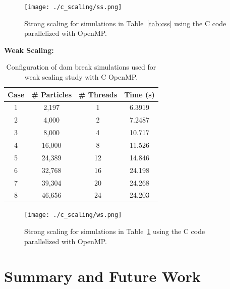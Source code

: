 \documentclass{scrartcl}
\begin{document}
    \begin{figure}
    	\begin{center}
    		\texttt{[image: ./c\_scaling/ss.png]}
    		\caption{Strong scaling for simulations in Table~\ref{tab:css} using the C code parallelized with OpenMP.}
    		\label{fig:ss_c_omp}
    	\end{center}
    \end{figure}
    
    \textbf{Weak Scaling:}
    \begin{table}
    	\begin{center}
    		\begin{tabular}{| c | c | c | c |}
    			\hline
    			Case & \# Particles & \# Threads & Time (s) \\ \hline
    			1 &  2,197 &  1 & 6.3919 \\ \hline		  		
    			2 &  4,000 &  2 & 7.2487 \\ \hline		  		
    			3 &  8,000 &  4 & 10.717 \\ \hline		  		
    			4 & 16,000 &  8 & 11.526 \\ \hline		  		
    			5 & 24,389 & 12 & 14.846 \\ \hline		  		
    			6 & 32,768 & 16 & 24.198 \\ \hline		  		
    			7 & 39,304 & 20 & 24.268 \\ \hline		  		
    			8 & 46,656 & 24 & 24.203 \\ \hline		  		
    		\end{tabular}
    		\caption{Configuration of dam break simulations used for weak scaling study with C OpenMP.}
    		\label{tab:cws}
    	\end{center}
    \end{table}
    
    \begin{figure}
    	\begin{center}
    		\texttt{[image: ./c\_scaling/ws.png]}
    		\caption{Strong scaling for simulations in Table~\ref{tab:cws} using the C code parallelized with OpenMP.}
    		\label{fig:ws_c_omp}
    	\end{center}
    \end{figure}
    
  
    \section{Summary and Future Work}
\end{document}
